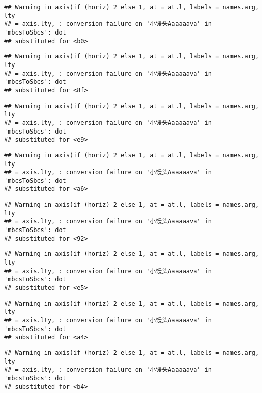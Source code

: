 \documentclass[
]{article}
\begin{document}
\begin{verbatim}
## Warning in axis(if (horiz) 2 else 1, at = at.l, labels = names.arg, lty
## = axis.lty, : conversion failure on '小馒头Aaaaaava' in 'mbcsToSbcs': dot
## substituted for <b0>
\end{verbatim}

\begin{verbatim}
## Warning in axis(if (horiz) 2 else 1, at = at.l, labels = names.arg, lty
## = axis.lty, : conversion failure on '小馒头Aaaaaava' in 'mbcsToSbcs': dot
## substituted for <8f>
\end{verbatim}

\begin{verbatim}
## Warning in axis(if (horiz) 2 else 1, at = at.l, labels = names.arg, lty
## = axis.lty, : conversion failure on '小馒头Aaaaaava' in 'mbcsToSbcs': dot
## substituted for <e9>
\end{verbatim}

\begin{verbatim}
## Warning in axis(if (horiz) 2 else 1, at = at.l, labels = names.arg, lty
## = axis.lty, : conversion failure on '小馒头Aaaaaava' in 'mbcsToSbcs': dot
## substituted for <a6>
\end{verbatim}

\begin{verbatim}
## Warning in axis(if (horiz) 2 else 1, at = at.l, labels = names.arg, lty
## = axis.lty, : conversion failure on '小馒头Aaaaaava' in 'mbcsToSbcs': dot
## substituted for <92>
\end{verbatim}

\begin{verbatim}
## Warning in axis(if (horiz) 2 else 1, at = at.l, labels = names.arg, lty
## = axis.lty, : conversion failure on '小馒头Aaaaaava' in 'mbcsToSbcs': dot
## substituted for <e5>
\end{verbatim}

\begin{verbatim}
## Warning in axis(if (horiz) 2 else 1, at = at.l, labels = names.arg, lty
## = axis.lty, : conversion failure on '小馒头Aaaaaava' in 'mbcsToSbcs': dot
## substituted for <a4>
\end{verbatim}

\begin{verbatim}
## Warning in axis(if (horiz) 2 else 1, at = at.l, labels = names.arg, lty
## = axis.lty, : conversion failure on '小馒头Aaaaaava' in 'mbcsToSbcs': dot
## substituted for <b4>
\end{verbatim}
\end{document}
